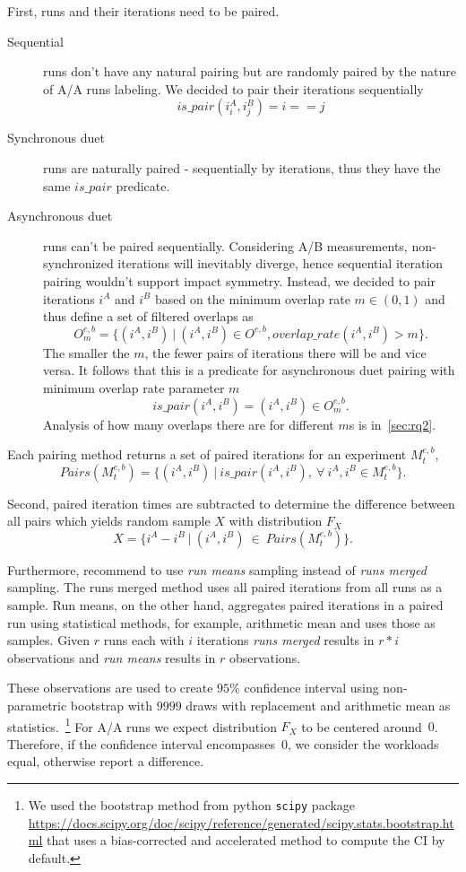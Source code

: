 First, runs and their iterations need to be paired.
\begin{description}
    \item[Sequential] runs don't have any natural pairing but are randomly paired by the nature of A/A runs labeling. We decided to pair their iterations sequentially
        $$
        is\_pair(i^A_i, i^B_j) = i == j
        $$
    \item[Synchronous duet] runs are naturally paired - sequentially by iterations, thus they have the same $is\_pair$ predicate.
    \item[Asynchronous duet] runs can't be paired sequentially.
        Considering A/B measurements, non-synchronized iterations will inevitably diverge, hence sequential iteration pairing wouldn't support impact symmetry.
        Instead, we decided to pair iterations $i^A$ and $i^B$ based on the minimum overlap rate $m \in (0, 1)$ and thus define a set of filtered overlaps as
        $$
        O^{e,b}_m = \{(i^A, i^B)~|~(i^A, i^B) \in O^{e, b}, overlap\_rate(i^A, i^B) > m\}.
        $$
        The smaller the $m$, the fewer pairs of iterations there will be and vice versa.
        It follows that this is a predicate for asynchronous duet pairing with minimum overlap rate parameter $m$
        $$
        is\_pair(i^A, i^B) = (i^A, i^B) \in O^{e,b}_m.
        $$
        Analysis of how many overlaps there are for different $m$s is in~\cref{sec:rq2}.
\end{description}
Each pairing method returns a set of paired iterations for an experiment $M^{e, b}_t$,
$$
Pairs(M^{e, b}_t) = \{(i^A, i^B)~|~is\_pair(i^A, i^B),~\forall~i^A, i^B \in M^{e, b}_t\}.
$$

Second, paired iteration times are subtracted to determine the difference between all pairs which yields random sample $X$ with distribution $F_X$
$$
X = \{i^A - i^B~|~(i^A, i^B)~\in~Pairs(M^{e, b}_t)\}.
$$

Furthermore, \citet{bulej2017stat} recommend to use \emph{run means} sampling instead of \emph{runs merged} sampling.
The runs merged method uses all paired iterations from all runs as a sample.
Run means, on the other hand, aggregates paired iterations in a paired run using statistical methods, for example, arithmetic mean and uses those as samples.
Given $r$ runs each with $i$ iterations \emph{runs merged} results in $r * i$ observations and \emph{run means} results in $r$ observations.

These observations are used to create $95\%$ confidence interval using non-parametric bootstrap with $9999$ draws with replacement and arithmetic mean as statistics.~\footnote{We used the bootstrap method from python \lstinline{scipy} package \url{https://docs.scipy.org/doc/scipy/reference/generated/scipy.stats.bootstrap.html} that uses a \mbox{bias-corrected} and accelerated method to compute the CI by default.}
For A/A runs we expect distribution $F_X$ to be centered around~$0$.
Therefore, if the confidence interval encompasses~$0$, we consider the workloads equal, otherwise report a difference.
 
